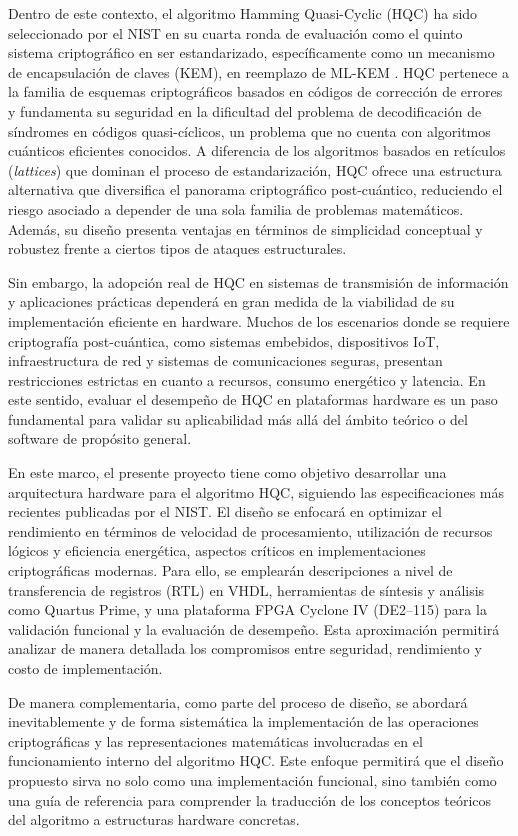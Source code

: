 Dentro de este contexto, el algoritmo Hamming Quasi-Cyclic (HQC) ha sido seleccionado por el NIST en su cuarta ronda de evaluación como el quinto sistema criptográfico en ser estandarizado, específicamente como un mecanismo de encapsulación de claves (KEM), en reemplazo de ML-KEM \cite{NISTIR8545_2025}. HQC pertenece a la familia de esquemas criptográficos basados en códigos de corrección de errores y fundamenta su seguridad en la dificultad del problema de decodificación de síndromes en códigos quasi-cíclicos, un problema que no cuenta con algoritmos cuánticos eficientes conocidos. A diferencia de los algoritmos basados en retículos (\textit{lattices}) que dominan el proceso de estandarización, HQC ofrece una estructura alternativa que diversifica el panorama criptográfico post-cuántico, reduciendo el riesgo asociado a depender de una sola familia de problemas matemáticos. Además, su diseño presenta ventajas en términos de simplicidad conceptual y robustez frente a ciertos tipos de ataques estructurales.

Sin embargo, la adopción real de HQC en sistemas de transmisión de información y aplicaciones prácticas dependerá en gran medida de la viabilidad de su implementación eficiente en hardware. Muchos de los escenarios donde se requiere criptografía post-cuántica, como sistemas embebidos, dispositivos IoT, infraestructura de red y sistemas de comunicaciones seguras, presentan restricciones estrictas en cuanto a recursos, consumo energético y latencia. En este sentido, evaluar el desempeño de HQC en plataformas hardware es un paso fundamental para validar su aplicabilidad más allá del ámbito teórico o del software de propósito general.

En este marco, el presente proyecto tiene como objetivo desarrollar una arquitectura hardware para el algoritmo HQC, siguiendo las especificaciones más recientes publicadas por el NIST. El diseño se enfocará en optimizar el rendimiento en términos de velocidad de procesamiento, utilización de recursos lógicos y eficiencia energética, aspectos críticos en implementaciones criptográficas modernas. Para ello, se emplearán descripciones a nivel de transferencia de registros (RTL) en VHDL, herramientas de síntesis y análisis como Quartus Prime, y una plataforma FPGA Cyclone IV (DE2--115) para la validación funcional y la evaluación de desempeño. Esta aproximación permitirá analizar de manera detallada los compromisos entre seguridad, rendimiento y costo de implementación.

De manera complementaria, como parte del proceso de diseño, se abordará inevitablemente y de forma sistemática la implementación de las operaciones criptográficas y las representaciones matemáticas involucradas en el funcionamiento interno del algoritmo HQC. Este enfoque permitirá que el diseño propuesto sirva no solo como una implementación funcional, sino también como una guía de referencia para comprender la traducción de los conceptos teóricos del algoritmo a estructuras hardware concretas.

